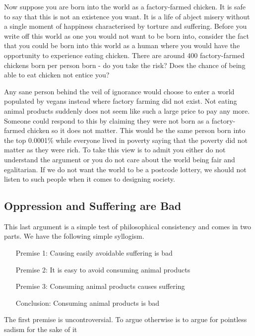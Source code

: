 Now suppose you are born into the world as a factory-farmed chicken. It is safe to say that this is not an existence you want. It is a life of abject misery without a single moment of happiness characterised by torture and suffering. Before you write off this world as one you would not want to be born into, consider the fact that you could be born into this world as a human where you would have the opportunity to experience eating chicken. There are around 400 factory-farmed chickens born per person born - do you take the risk? Does the chance of being able to eat chicken not entice you?

Any sane person behind the veil of ignorance would choose to enter a world populated by vegans instead where factory farming did not exist. Not eating animal products suddenly does not seem like such a large price to pay any more. Someone could respond to this by claiming they were not born as a factory-farmed chicken so it does not matter. This would be the same person born into the top 0.0001\% while everyone lived in poverty saying that the poverty did not matter as they were rich. To take this view is to admit you either do not understand the argument or you do not care about the world being fair and egalitarian. If we do not want the world to be a postcode lottery, we should not listen to such people when it comes to designing society.

\subsection{Oppression and Suffering are Bad}

This last argument is a simple test of philosophical consistency and comes in two parts. We have the following simple syllogism.

\begin{itemize}[leftmargin=25mm]
    \item[Premise 1:] Causing easily avoidable suffering is bad
    \item[Premise 2:] It is easy to avoid consuming animal products
    \item[Premise 3:] Consuming animal products causes suffering
    \item[Conclusion:] Consuming animal products is bad
\end{itemize}

The first premise is uncontroversial. To argue otherwise is to argue for pointless sadism for the sake of it